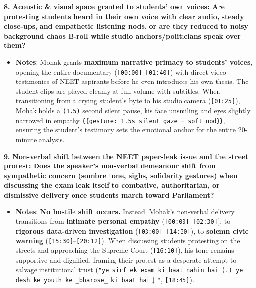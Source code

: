 \documentclass[10pt,a4paper]{article}
\begin{document}
\noindent\textbf{8.} \textbf{Acoustic \& visual space granted to students' own voices: Are protesting students heard in their own voice with clear audio, steady close-ups, and empathetic listening nods, or are they reduced to noisy background chaos B-roll while studio anchors/politicians speak over them?}\par\smallskip
\begin{itemize}
  \item \textbf{Notes:}
Mohak grants \textbf{maximum narrative primacy to students' voices}, opening the entire documentary (\texttt{[00:00]}--\texttt{[01:40]}) with direct video testimonies of NEET aspirants before he even introduces his own thesis. The student clips are played cleanly at full volume with subtitles. When transitioning from a crying student's byte to his studio camera (\texttt{[01:25]}), Mohak holds a \texttt{(1.5)} second silent pause, his face unsmiling and eyes slightly narrowed in empathy \texttt{\{\{gesture: 1.5s silent gaze + soft nod\}\}}, ensuring the student's testimony sets the emotional anchor for the entire 20-minute analysis.\par\smallskip
\end{itemize}

\noindent\textbf{9.} \textbf{Non-verbal shift between the NEET paper-leak issue and the street protest: Does the speaker's non-verbal demeanour shift from sympathetic concern (sombre tone, sighs, solidarity gestures) when discussing the exam leak itself to combative, authoritarian, or dismissive delivery once students march toward Parliament?}\par\smallskip
\begin{itemize}
  \item \textbf{Notes:}
\textbf{No hostile shift occurs.} Instead, Mohak's non-verbal delivery transitions from \textbf{intimate personal empathy} (\texttt{[00:00]}--\texttt{[02:30]}), to \textbf{rigorous data-driven investigation} (\texttt{[03:00]}--\texttt{[14:30]}), to \textbf{solemn civic warning} (\texttt{[15:30]}--\texttt{[20:12]}). When discussing students protesting on the streets and approaching the Supreme Court (\texttt{[16:10]}), his tone remains supportive and dignified, framing their protest as a desperate attempt to salvage institutional trust (\texttt{"ye sirf ek exam ki baat nahin hai (.) ye desh ke youth ke \_bharose\_ ki baat hai$\downarrow$"}, \texttt{[18:45]}).\par\smallskip
\end{itemize}
\end{document}
